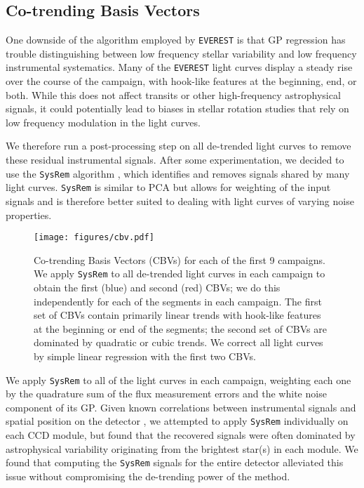 \documentclass[]{emulateapj}
\begin{document}
\subsection{Co-trending Basis Vectors}
\label{sec:cbvs}
One downside of the algorithm employed by \texttt{EVEREST} is that GP regression has trouble
distinguishing between low frequency stellar variability and low frequency instrumental
systematics. Many of the \texttt{EVEREST} light curves display a steady rise over the
course of the campaign, with hook-like features at the beginning, end, or both. While this
does not affect transits or other high-frequency astrophysical signals, it could potentially
lead to biases in stellar rotation studies that rely on low frequency modulation in the
light curves.

We therefore run a post-processing step on all de-trended light curves to remove these
residual instrumental signals. After some experimentation, we decided to use the
\texttt{SysRem} algorithm \citep{Tamuz05}, which identifies and removes signals shared by many
light curves. \texttt{SysRem} is similar to PCA but allows for weighting of the input
signals and is therefore better suited to dealing with light curves of varying noise
properties.

\begin{figure}[hbt]
  \begin{center}
      \texttt{[image: figures/cbv.pdf]}
      \caption{Co-trending Basis Vectors (CBVs) for each of the first 9 campaigns. 
         We apply \texttt{SysRem} to all de-trended light curves 
         in each campaign to obtain the first (blue) and second (red) CBVs; we do this
         independently for each of the segments in each campaign.
         The first set of CBVs contain primarily linear trends with hook-like
         features at the beginning or end of the segments; the second set of CBVs are
         dominated by quadratic or cubic trends. We correct all 
         light curves by simple
         linear regression with the first two CBVs.}
     \label{fig:cbv}
  \end{center}
\end{figure}

We apply \texttt{SysRem} to all of the light curves in each campaign, weighting each one
by the quadrature sum of the flux measurement errors and the white noise component of its
GP. Given known correlations between instrumental signals and spatial position on the
detector \citep[e.g.,][]{Petigura12,Wang16}, we attempted to apply \texttt{SysRem} individually
on each CCD module, but found that the recovered signals were often dominated by
astrophysical variability originating from the brightest star(s) in each module. 
We found that computing the \texttt{SysRem} signals for the entire detector alleviated 
this issue without compromising the de-trending power of the method.
\end{document}
